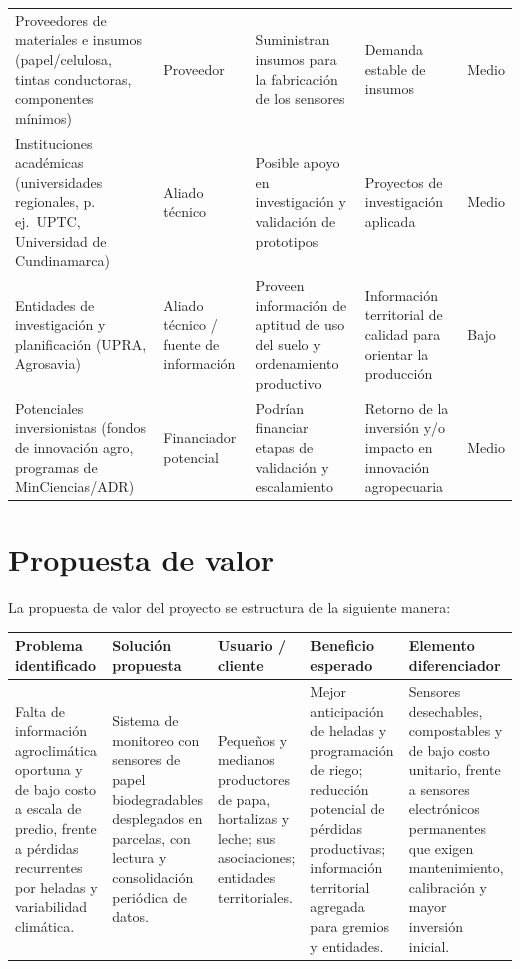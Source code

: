 \documentclass[11pt,a4paper]{article}
\begin{document}
\begin{longtable}{L{2.6cm}L{2.6cm}L{2.6cm}L{3cm}L{2.4cm}}
Proveedores de materiales e insumos (papel/celulosa, tintas conductoras, componentes mínimos) & Proveedor & Suministran insumos para la fabricación de los sensores & Demanda estable de insumos & Medio\\
Instituciones académicas (universidades regionales, p.\,ej.\ UPTC, Universidad de Cundinamarca) & Aliado técnico & Posible apoyo en investigación y validación de prototipos & Proyectos de investigación aplicada & Medio\\
Entidades de investigación y planificación (UPRA, Agrosavia) & Aliado técnico / fuente de información & Proveen información de aptitud de uso del suelo y ordenamiento productivo & Información territorial de calidad para orientar la producción & Bajo\\
Potenciales inversionistas (fondos de innovación agro, programas de MinCiencias/ADR) & Financiador potencial & Podrían financiar etapas de validación y escalamiento & Retorno de la inversión y/o impacto en innovación agropecuaria & Medio\\
\bottomrule
\end{longtable}

\section{Propuesta de valor}

La propuesta de valor del proyecto se estructura de la siguiente manera:

\begin{center}
\begin{tabularx}{\textwidth}{L{2.6cm}L{3.1cm}L{2.6cm}L{3cm}L{3cm}}
\toprule
\textbf{Problema identificado} & \textbf{Solución propuesta} & \textbf{Usuario / cliente} & \textbf{Beneficio esperado} & \textbf{Elemento diferenciador}\\
\midrule
Falta de información agroclimática oportuna y de bajo costo a escala de predio, frente a pérdidas recurrentes por heladas y variabilidad climática. & Sistema de monitoreo con sensores de papel biodegradables desplegados en parcelas, con lectura y consolidación periódica de datos. & Pequeños y medianos productores de papa, hortalizas y leche; sus asociaciones; entidades territoriales. & Mejor anticipación de heladas y programación de riego; reducción potencial de pérdidas productivas; información territorial agregada para gremios y entidades. & Sensores desechables, compostables y de bajo costo unitario, frente a sensores electrónicos permanentes que exigen mantenimiento, calibración y mayor inversión inicial.\\
\bottomrule
\end{tabularx}
\end{center}
\end{document}
